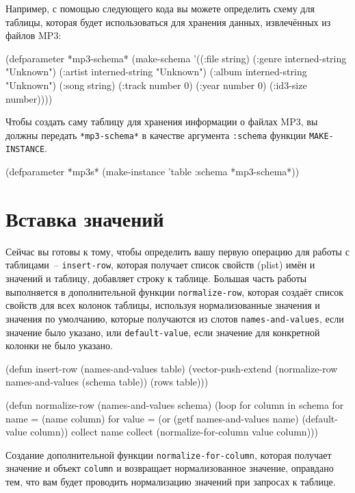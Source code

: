 Например, с помощью следующего кода вы можете определить схему для таблицы, которая будет
использоваться для хранения данных, извлечённых из файлов MP3:

\begin{myverb}
(defparameter *mp3-schema* 
  (make-schema 
   '((:file     string)
     (:genre    interned-string "Unknown")
     (:artist   interned-string "Unknown")
     (:album    interned-string "Unknown")
     (:song     string)
     (:track    number 0)
     (:year     number 0)
     (:id3-size number))))
\end{myverb}

Чтобы создать саму таблицу для хранения информации о файлах MP3, вы должны передать
\lstinline{*mp3-schema*} в качестве аргумента \lstinline{:schema} функции \lstinline{MAKE-INSTANCE}.

\begin{myverb}
(defparameter *mp3s* (make-instance 'table :schema *mp3-schema*))
\end{myverb}

\section{Вставка значений}

Сейчас вы готовы к тому, чтобы определить вашу первую операцию для работы с таблицами~--
\lstinline{insert-row}, которая получает список свойств (plist) имён и значений и таблицу,
добавляет строку к таблице.  Большая часть работы выполняется в дополнительной функции
\lstinline{normalize-row}, которая создаёт список свойств для всех колонок таблицы, используя
нормализованные значения и значения по умолчанию, которые получаются из слотов
\lstinline{names-and-values}, если значение было указано, или \lstinline{default-value}, если
значение для конкретной колонки не было указано.

\begin{myverb}
(defun insert-row (names-and-values table)
  (vector-push-extend (normalize-row names-and-values (schema table)) (rows table)))

(defun normalize-row (names-and-values schema)
  (loop
     for column in schema
     for name  = (name column)
     for value = (or (getf names-and-values name) (default-value column))
     collect name
     collect (normalize-for-column value column)))
\end{myverb}

Создание дополнительной функции \lstinline{normalize-for-column}, которая получает значение и
объект \lstinline{column} и возвращает нормализованное значение, оправдано тем, что вам будет
проводить нормализацию значений при запросах к таблице.

